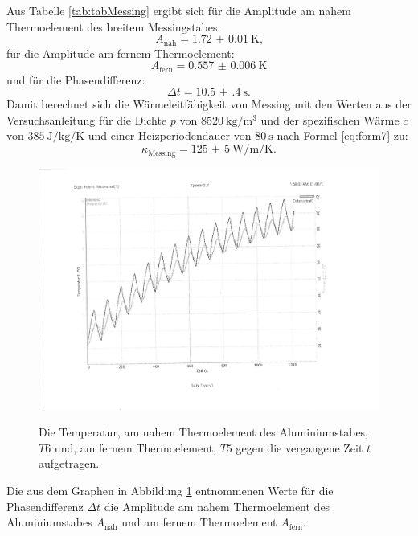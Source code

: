 Aus Tabelle \ref{tab:tabMessing} ergibt sich für die Amplitude am nahem Thermoelement des breitem Messingstabes:
\begin{displaymath}
A_\text{nah} = \SI{1.72(1)}{\kelvin}\text{,}
\end{displaymath}
für die Amplitude am fernem Thermoelement:
\begin{displaymath}
A_\text{fern} = \SI{0.557(6)}{\kelvin}
\end{displaymath}
und für die Phasendifferenz:
\begin{displaymath}
\Delta t = \SI{10.5(4)}{\second}\text{.}
\end{displaymath}
Damit berechnet sich die Wärmeleitfähigkeit von Messing mit den Werten aus der Versuchsanleitung \cite{V204} für die Dichte $p$ von $\SI{8520}{\kilo\gram\per\meter\tothe{3}}$ und der spezifischen Wärme $c$ von $\SI{385}{\joule\per\kilo\gram\per\kelvin}$ und einer Heizperiodendauer von $\SI{80}{\second}$ nach Formel \eqref{eq:form7} zu:
\begin{displaymath}
\kappa_\text{Messing} = \SI{125(5)}{\watt\per\meter\per\kelvin}\text{.}
\end{displaymath}
\begin{figure}
	\centering
	\caption{Die Temperatur, am nahem Thermoelement des Aluminiumstabes, $T6$ und, am fernem Thermoelement, $T5$ gegen die vergangene Zeit $t$ aufgetragen.}
	\includegraphics[width=\linewidth-70pt,height=\textheight-70pt,keepaspectratio]{content/Bilder/T5T6-rotated.pdf}
	\label{fig:Graph6}
\end{figure}
\begin{table}
	\centering
	\caption{Die aus dem Graphen in Abbildung \ref{fig:Graph6} entnommenen Werte für die Phasendifferenz $\Delta t$ die Amplitude am nahem Thermoelement des Aluminiumstabes $A_\text{nah}$ und am fernem Thermoelement $A_\text{fern}$.}
	
\end{table}

